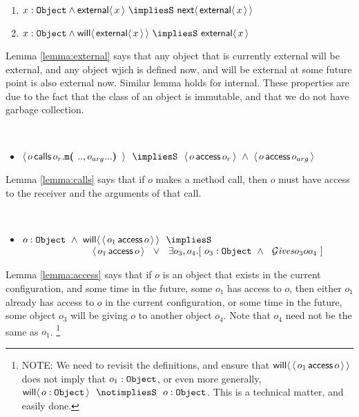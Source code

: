 \documentclass[acmsmall,screen,anonymous,review]{acmart}
\begin{document}
\begin{lemma}
\label{lemma:external}
~ ~ 

\begin{enumerate}
\item
$x:\prg{Object} \wedge \External {x} \ \impliesS \ \Next{\External{x}}$
\item
$x:\prg{Object} \wedge \Future{\External {x}} \ \impliesS \ {\External{x}}$
\end{enumerate}
\end{lemma}

Lemma \ref{lemma:external} says that any object that is currently external will be external, and any object wjich is defined now, and will be external at some future point is
also external now. Similar lemma holds for internal. These properties are due to the fact that the class of an object is immutable, and that we
do not have garbage collection.


\begin{lemma}
\label{lemma:calls}
~ ~ 

\begin{itemize}
\item
$\Calls {o} {\prg{m}}  {o_r}  {..,o_{arg}...} \ \ \impliesS  \ \ {\CanAccess {o} {o_r}} \ \wedge \  {\CanAccess {o} {o_{arg}} }  $
\end{itemize}
\end{lemma}

Lemma \ref{lemma:calls} says that if $o$ makes a method call, then $o$ must have access to the receiver and the arguments of that call.

\begin{lemma}
\label{lemma:access}
~ ~ 

\begin{itemize}
\item
$o:\prg{Object}\ \wedge\ {\Future {  \CanAccess {o_1} {o} }} \ \ \impliesS  $\\
$\strut \hspace{1in} \CanAccess {o_1} {o}\ \ 
\vee \ \ \exists o_3,o_4.[\ o_3:\prg{Object} \ \wedge\ \ {\Gives {o_3} {o}{o_4}} \ ]  $
\end{itemize}
\end{lemma}

Lemma \ref{lemma:access} says that if $o$ is an object that exists in the current configuration,
 and some time in the future, some $o_1$ has access to $o$,
then either $o_1$ already has access to $o$ in the current configuration, or   
 some time in the future, some object $o_3$ will be giving $o$ to another object $o_4$.
Note that $o_4$ need not be the same as $o_1$.
\footnote{NOTE: We need to revisit the definitions, and ensure that ${{\mathsf{will}}\langle \,  \langle\, o_1\, \mathsf{access}\, o\, \rangle \,\rangle}$ does not imply that
$o_1:{\mbox{\tt{Object}}}$, or even more generally,    ${\Future {  o:\prg{Object}}} \ \ \notimpliesS\ \ o:\prg{Object}$. This is a technical matter,
and easily done.}
\end{document}
